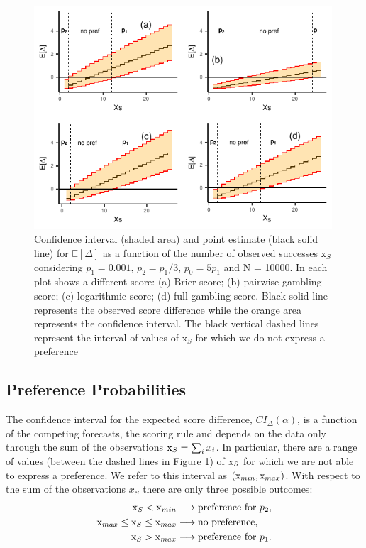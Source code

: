 \documentclass[referee,sn-basic]{sn-jnl}
\theoremstyle{thmstyleone}%
\theoremstyle{thmstyletwo}%
\theoremstyle{thmstylethree}%
\begin{document}
\begin{figure}
  \includegraphics[width = 0.99\textwidth]{figure5.pdf}
\caption{Confidence interval (shaded area) and point estimate (black solid line) for $\mathbb E[\Delta]$ as a function of the number of observed successes $\text{x}_S$ considering $p_1 = 0.001$, $p_2 = p_1/3$, $p_0 = 5p_1$ and N = 10000. In each plot shows a different score: (a) Brier score; (b) pairwise gambling score; (c) logarithmic score; (d) full gambling score. Black solid line represents the observed score difference while the orange area represents the confidence interval. The black vertical dashed lines represent the interval of values of $\text{x}_S$ for which we do not express a preference}
\label{fig:5}
\end{figure}

\subsection{ Preference Probabilities } 

The confidence interval for the expected score difference, $CI_\Delta(\alpha)$, is a function of the competing forecasts, the scoring rule and depends on the data only through the sum of the observations $\text x_S = \sum_i x_i$. In particular, there are a range of values (between the dashed lines in Figure \ref{fig:5}) of $\text x_S$ for which we are not able to express a preference. We refer to this interval as $(\text x_{min}, \text x_{max})$. With respect to the sum of the observations $x_S$ there are only three possible outcomes:
\begin{align*}
\text x_S < \text x_{min} &\longrightarrow \text{preference for }p_2, \\
\text x_{max} \leq \text x_S \leq \text x_{max} &\longrightarrow \text{no preference}, \\
\text x_S > \text x_{max} &\longrightarrow \text{preference for }p_1.
\end{align*}
\end{document}
